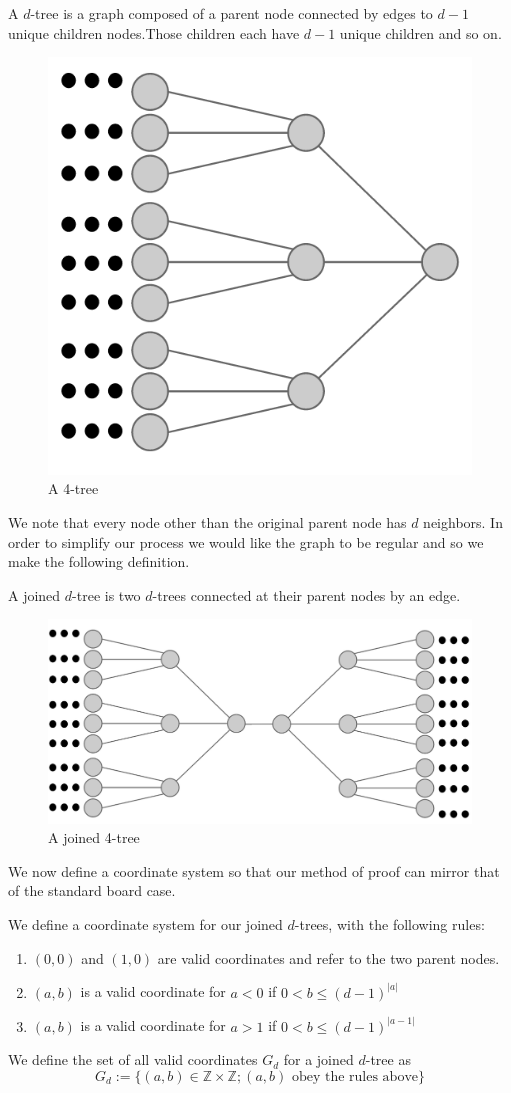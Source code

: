 \documentclass[runningheads,a4paper]{llncs}
\begin{document}
\begin{definition}
A $d$-tree is a graph composed of a parent node connected by edges to $d-1$ unique children nodes.Those children each have $d-1$ unique children and so on.  
\end{definition}
\begin{figure}[!h]
\label{4tree}
\centering
\includegraphics[width=0.4\linewidth]{4tree}
\caption{A 4-tree}
\end{figure}
We note that every node other than the original parent node has $d$ neighbors. In order to simplify our process we would like the graph to be regular and so we make the following definition. 
\begin{definition}
A joined $d$-tree is two $d$-trees connected at their parent nodes by an edge.
\end{definition}
\begin{figure}[!h]
\label{joined4tree}
\centering
\includegraphics[width=0.8\linewidth]{joined4tree}
\caption{A joined 4-tree}
\end{figure}

We now define a coordinate system so that our method of proof can mirror that of the standard board case.
\begin{definition} We define a coordinate system for our joined $d$-trees, with the following rules:
\begin{enumerate}
	\item $(0,0)$ and $(1,0)$ are valid coordinates and refer to the two parent nodes.
	\item $(a,b)$ is a valid coordinate for $a<0$ if $0<b \leq (d-1)^{|a|}$
	\item $(a,b)$ is a valid coordinate for $a>1$ if $0<b \leq (d-1)^{|a-1|}$
\end{enumerate}
We define the set of all valid coordinates $G_d$ for a joined $d$-tree as 
\begin{equation}
G_d:= \{ (a,b) \in \mathbb{Z} \times \mathbb{Z} ; (a,b) \text{ obey the rules above}\}
\end{equation}
\end{definition}
\end{document}
